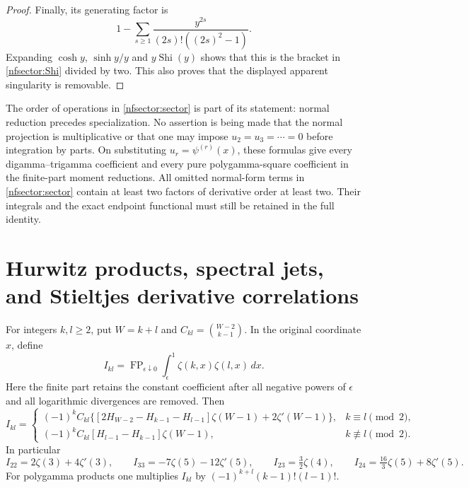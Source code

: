 \documentclass[11pt,a4paper]{article}
\numberwithin{equation}{section}
\theoremstyle{definition}
\theoremstyle{remark}
\begin{document}
\begin{proof}
Finally, its generating factor is
\[
 1-\sum_{s\ge1}\frac{y^{2s}}{(2s)!((2s)^2-1)}.
\]
Expanding $\cosh y$, $\sinh y/y$ and $y\operatorname{Shi}(y)$
shows that this is the bracket in \eqref{nfsector:Shi} divided by two.
This also proves that the displayed apparent singularity is removable.
\end{proof}

The order of operations in \eqref{nfsector:sector} is part of its
statement: normal reduction precedes specialization.  No assertion is
being made that the normal projection is multiplicative or that one
may impose $u_2=u_3=\cdots=0$ before integration by parts.
On substituting $u_r=\psi^{(r)}(x)$, these formulas give every
digamma--trigamma coefficient and every pure polygamma-square coefficient
in the finite-part moment reductions.  All omitted normal-form terms
in \eqref{nfsector:sector} contain at least two factors of derivative
order at least two.  Their integrals and the exact endpoint functional
must still be retained in the full identity.



\section[Hurwitz products, spectral jets, and Stieltjes derivative correlations]{Hurwitz products, spectral jets,\\and Stieltjes derivative correlations}
\label{hprod:sec}

For integers $k,l\ge2$, put $W=k+l$ and
$C_{kl}=\binom{W-2}{k-1}$.  In the original coordinate $x$, define
\[
 I_{kl}=\operatorname{FP}_{\epsilon\downarrow0}
 \int_\epsilon^1\zeta(k,x)\zeta(l,x)\,dx.
\]
Here the finite part retains the constant coefficient after all negative
powers of $\epsilon$ and all logarithmic divergences are removed.
Then
\[
 I_{kl}=
 \begin{cases}
 (-1)^kC_{kl}\bigl\{[2H_{W-2}-H_{k-1}-H_{l-1}]\zeta(W-1)
                    +2\zeta'(W-1)\bigr\},&k\equiv l\pmod2,\\[3pt]
 (-1)^kC_{kl}[H_{l-1}-H_{k-1}]\zeta(W-1),&k\not\equiv l\pmod2.
 \end{cases}
\]
In particular
\[
 I_{22}=2\zeta(3)+4\zeta'(3),\qquad
 I_{33}=-7\zeta(5)-12\zeta'(5),\qquad
 I_{23}=\tfrac32\zeta(4),\qquad
 I_{24}=\tfrac{16}{3}\zeta(5)+8\zeta'(5).
\]
For polygamma products one multiplies $I_{kl}$ by
$(-1)^{k+l}(k-1)!(l-1)!$.
\end{document}
